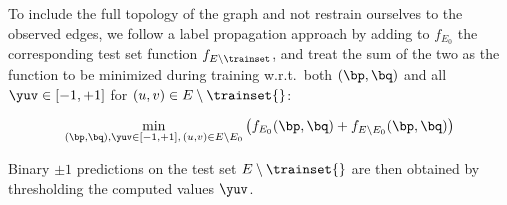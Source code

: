 To include the full topology of the graph and not restrain ourselves to the observed edges,
we follow a label propagation approach by adding to $f_{E_0}$ the corresponding test set function
$f_{E\setminus \trainset}$, and treat the sum of the two as the function to be minimized during
training w.r.t.\ both $(\bp,\bq)$ and all $\yuv \in [-1,+1]$ for $(u,v)\in E\setminus \trainset{}$:

\begin{equation}\label{e:quadratic}
  \min_{(\bp,\bq), \yuv \in [-1,+1],\,(u,v)\in E\setminus E_0}
  \left(f_{E_0}(\bp,\bq) + f_{E\setminus E_0}(\bp,\bq)\right)
\end{equation}

Binary $\pm 1$ predictions on the test set $E\setminus \trainset{}$ are then obtained by
thresholding the computed values $\yuv$.

\iffalse
********************************************************
and then solve for parameters $\{p_u, q_i\}_{u=1}^{|V|}$.
Yet, it may well be the case that some such parameters never occur in all these equations.\footnote
{
On the other hand, recall that no pairing $(u,v) \in E$ can occur more than once here, since \trainset{} is sampled without replacement.
}
This will happen precisely whenever $\Nout(u)$ or $\Nin(v)$ are not represented in \trainset{}. Specifically, if $E_0 \cap \Nout(u) = \emptyset$ then $p_u$ does not occur, and if $E_0 \cap \Nin(v) = \emptyset$ then $q_v$ does not occur. Hence, for each unsampled edge $(\ell,v)\in E\setminus \trainset{}$, we add to~(\ref{e:mlp2}) the equations
\[
p_{\ell}+q_v = 1+y_{\ell,v}~,
\]
motivated by the fact that $\E \left[\frac{1+y_{\ell,v}}{2}\,|\, (\ell,v)\right] =  \frac{p_{\ell}+q_v}{2}$. Similarly, we add to~(\ref{e:mlq2}) the equations
\[
p_u+q_{\ell} = 1+y_{u,\ell}~.
\]
This gives rise to the following set of equations
%
\begin{align}
p_{u}+ \frac{1}{\dout(u)}\,\sum_{v \in \Nout(u)} q_{v}
&=
\frac{1}{\dout(u)}\,\sum_{v=1}^{|V|} (1+\yuv), \qquad u = 1, \ldots, |V|~,\label{e:mlpa}\\
q_{v} +  \frac{1}{\din(v)}\,\sum_{u \in \Nin(v)} p_{u}
&=
\frac{1}{\din(v)}\,\sum_{u=1}^{|V|} (1+\yuv), \qquad v = 1, \ldots, |V|\,,\label{e:mlqa}\\
1+\yuv &= p_u+q_{v},\qquad\qquad\qquad\quad\,\, (u,v) \in E\setminus E_0~.\label{e:mlya}
\end{align}
%
*******************************************************
\fi


